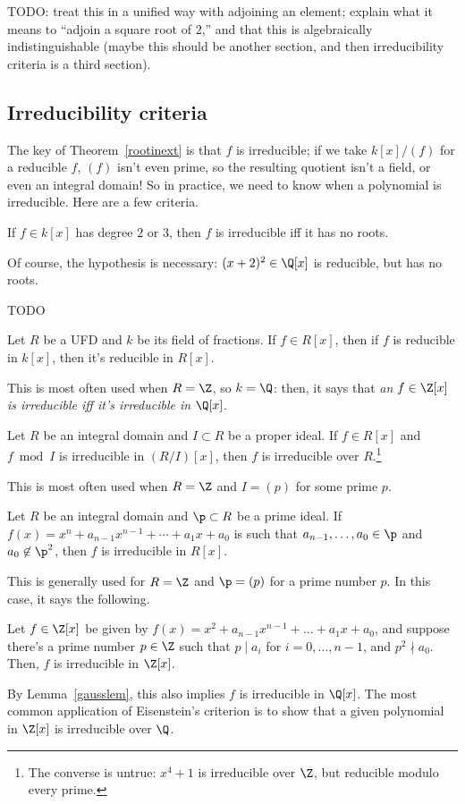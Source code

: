 {\color{red}TODO}: treat this in a unified way with adjoining an element; explain what it means to ``adjoin a
square root of $2$,'' and that this is algebraically indistinguishable (maybe this should be another section, and
then irreducibility criteria is a third section).

\subsection*{Irreducibility criteria}
The key of Theorem~\ref{rootinext} is that $f$ is irreducible; if we take $k[x]/(f)$ for a reducible $f$,
$(f)$ isn't even prime, so the resulting quotient isn't a field, or even an integral domain! So in practice, we
need to know when a polynomial is irreducible. Here are a few criteria.
\begin{lem}
\label{cubirred}
If $f\in k[x]$ has degree $2$ or $3$, then $f$ is irreducible iff it has no roots.
\end{lem}
Of course, the hypothesis is necessary: $(x+2)^2\in\Q[x]$ is reducible, but has no roots.
\begin{thm}
{\color{red}TODO}
\end{thm}
\begin{lem}
\label{gausslem}
Let $R$ be a UFD and $k$ be its field of fractions. If $f\in R[x]$, then if $f$ is reducible in $k[x]$, then it's
reducible in $R[x]$.
\end{lem}
This is most often used when $R = \Z$, so $k = \Q$: then, it says that \emph{an $f\in\Z[x]$ is irreducible iff it's
irreducible in $\Q[x]$}.
\begin{prop}
Let $R$ be an integral domain and $I\subset R$ be a proper ideal. If $f\in R[x]$ and $f\bmod I$ is irreducible in
$(R/I)[x]$, then $f$ is irreducible over $R$.\footnote{The converse is untrue: $x^4+1$ is irreducible over $\Z$,
but reducible modulo every prime.}
\end{prop}
This is most often used when $R = \Z$ and $I = (p)$ for some prime $p$.
\begin{prop}
Let $R$ be an integral domain and $\p\subset R$ be a prime ideal. If $f(x) = x^n + a_{n-1}x^{n-1} + \dotsb + a_1x +
a_0$ is such that $a_{n-1},\dotsc,a_0\in\p$ and $a_0\not\in\p^2$, then $f$ is irreducible in $R[x]$.
\end{prop}
This is generally used for $R = \Z$ and $\p = (p)$ for a prime number $p$. In this case, it says the following.
\begin{cor}
Let $f\in\Z[x]$ be given by $f(x) = x^2 + a_{n-1}x^{n-1} + \dotsc + a_1x + a_0$, and suppose there's a prime number
$p\in\Z$ such that $p\mid a_i$ for $i = 0,\dotsc,n-1$, and $p^2\nmid a_0$. Then, $f$ is irreducible in $\Z[x]$.
\end{cor}
By Lemma~\ref{gausslem}, this also implies $f$ is irreducible in $\Q[x]$. The most common application of
Eisenstein's criterion is to show that a given polynomial in $\Z[x]$ is irreducible over $\Q$.

